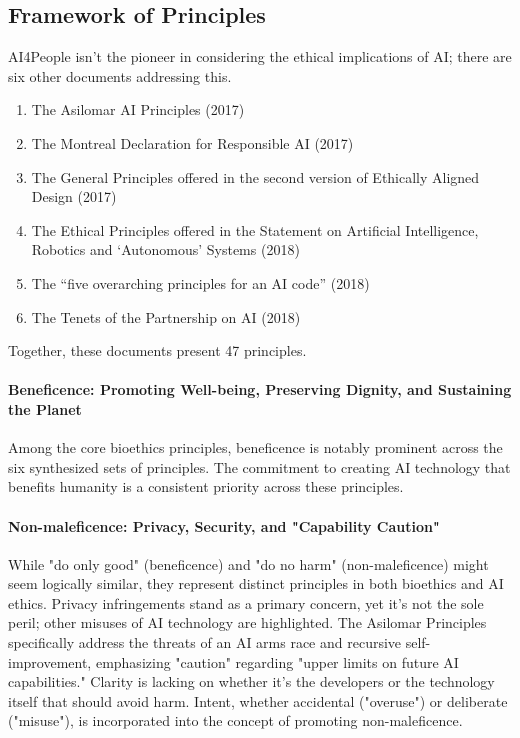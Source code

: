 \subsection{Framework of Principles}
AI4People isn't the pioneer in considering the ethical implications of AI; there are six other documents addressing this. 
\begin{enumerate}
    \item The Asilomar AI Principles (2017)
    \item The Montreal Declaration for Responsible AI (2017)
    \item The General Principles offered in the second version of Ethically Aligned Design (2017)
    \item The Ethical Principles offered in the Statement on Artificial Intelligence, Robotics and ‘Autonomous’ Systems (2018)
    \item The “five overarching principles for an AI code” (2018)
    \item The Tenets of the Partnership on AI (2018)
\end{enumerate}

Together, these documents present 47 principles.

\paragraph{Beneficence: Promoting Well-being, Preserving Dignity, and Sustaining the Planet}
Among the core bioethics principles, beneficence is notably prominent across the six synthesized sets of principles. The commitment to creating AI technology that benefits humanity is a consistent priority across these principles.

\paragraph{Non-maleficence: Privacy, Security, and "Capability Caution"}
While "do only good" (beneficence) and "do no harm" (non-maleficence) might seem logically similar, they represent distinct principles in both bioethics and AI ethics. Privacy infringements stand as a primary concern, yet it's not the sole peril; other misuses of AI technology are highlighted. The Asilomar Principles specifically address the threats of an AI arms race and recursive self-improvement, emphasizing "caution" regarding "upper limits on future AI capabilities." Clarity is lacking on whether it's the developers or the technology itself that should avoid harm. Intent, whether accidental ("overuse") or deliberate ("misuse"), is incorporated into the concept of promoting non-maleficence.

